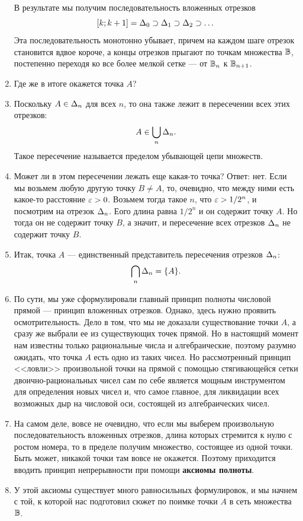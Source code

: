 \begin{enumerate}
В результате мы получим последовательность вложенных отрезков
$$
[k;k+1]=\Delta_0\supset\Delta_1\supset\Delta_2\supset\dots
$$
Эта последовательность монотонно убывает, причем на каждом шаге отрезок становится вдвое короче, а концы отрезков прыгают по точкам множества $\mathbb B$, постепенно переходя ко все более мелкой сетке --- от $\mathbb B_n$ к $\mathbb B_{n+1}$.

\item Где же в итоге окажется точка $A$?
\item Поскольку $A\in\Delta_n$ для всех $n$, то она также лежит в пересечении всех этих отрезков:
$$
A\in\bigcup_n\Delta_n.
$$
Такое пересечение называется пределом убывающей цепи множеств.
\item Может ли в этом пересечении лежать еще какая-то точка? Ответ: нет. Если мы возьмем любую другую точку $B\ne A$, то, очевидно, что между ними есть какое-то расстояние $\varepsilon>0$. Возьмем тогда такое $n$, что $\varepsilon>1/2^n$, и посмотрим на отрезок $\Delta_n$. Еого длина равна $1/2^n$ и он содержит точку $A$. Но тогда он не содержит точку $B$, а значит, и пересечение всех отрезков $\Delta_n$ не содержит точку $B$.
\item Итак, точка $A$ --- единственный представитель пересечения отрезков $\Delta_n$:
$$
\bigcap_n\Delta_n = \{A\}.
$$
\item По сути, мы уже сформулировали главный принцип полноты числовой прямой --- принцип вложенных отрезков. Однако, здесь нужно проявить осмотрительность. Дело в том, что мы не доказали существование точки $A$, а сразу же выбрали ее из существующих точек прямой. Но в настоящий момент нам известны только рациональные числа и алгебраические, поэтому разумно ожидать, что точка $A$ есть одно из таких чисел. Но рассмотренный принцип <<ловли>> произвольной точки на прямой с помощью стягивающейся сетки двоично-рациональных чисел сам по себе является мощным инструментом для определения новых чисел и, что самое главное, для ликвидации всех возможных дыр на числовой оси, состоящей из алгебраических чисел.
\item На самом деле, вовсе не очевидно, что если мы выберем произвольную последовательность вложенных отрезков, длина которых стремится к нулю с ростом номера, то в пределе получим множество, состоящее из одной точки. Быть может, никакой точки там вовсе не окажется. Поэтому приходится вводить принцип непрерывности при помощи \textbf{аксиомы полноты}.
\item У этой аксиомы существует много равносильных формулировок, и мы начнем с той, к которой нас подготовил сюжет по поимке точки $A$ в сеть множества $\mathbb B$.

\end{enumerate}
